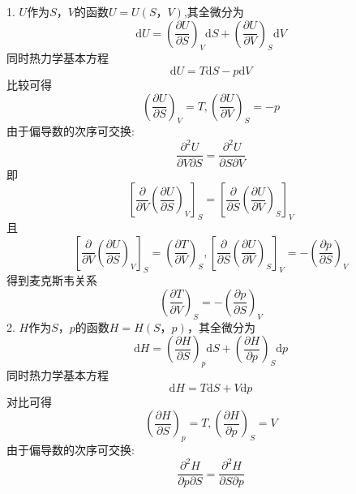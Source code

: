 1.
$U$作为$S$，$V$的函数$U=U(S，V)$,其全微分为
\begin{equation}
    \mathrm{d}U=\left( \frac{\partial U}{\partial S} \right) _V\mathrm{d}S+\left( \frac{\partial U}{\partial V} \right) _S\mathrm{d}V
\end{equation}
同时热力学基本方程
\begin{equation}
    \mathrm{d}U=T\mathrm{d}S-p\mathrm{d}V
\end{equation}
比较可得
\begin{equation}
    \left( \frac{\partial U}{\partial S} \right) _V=T,\left( \frac{\partial U}{\partial V} \right) _S=-p
\end{equation}
由于偏导数的次序可交换: 
\begin{equation}
    \frac{\partial ^2U}{\partial V\partial S}=\frac{\partial ^2U}{\partial S\partial V}
\end{equation}
即
\begin{equation}
    \left[ \frac{\partial}{\partial V}\left( \frac{\partial U}{\partial S} \right) _V \right] _S=\left[ \frac{\partial}{\partial S}\left( \frac{\partial U}{\partial V} \right) _S \right] _V
\end{equation}
且
\begin{equation}
    \left[ \frac{\partial}{\partial V}\left( \frac{\partial U}{\partial S} \right) _V \right] _S=\left( \frac{\partial T}{\partial V} \right) _S,\left[ \frac{\partial}{\partial S}\left( \frac{\partial U}{\partial V} \right) _S \right] _V=-\left( \frac{\partial p}{\partial S} \right) _V
\end{equation}
得到麦克斯韦关系
\begin{equation}
    \left( \frac{\partial T}{\partial V} \right) _S=-\left( \frac{\partial p}{\partial S} \right) _V
\end{equation}
2.
$H$作为$S$，$p$的函数$H=H(S，p)$，其全微分为
\begin{equation}
    \mathrm{d}H=\left( \frac{\partial H}{\partial S} \right) _{p}\mathrm{d}S+\left( \frac{\partial H}{\partial p} \right) _{S}\mathrm{d}p
\end{equation}
同时热力学基本方程
\begin{equation}
    \mathrm{d}H=T\mathrm{d}S+V\mathrm{d}p
\end{equation}
对比可得
\begin{equation}
    \left( \frac{\partial H}{\partial S} \right) _{p}=T,\left( \frac{\partial H}{\partial p} \right) _{S}=V
\end{equation}
由于偏导数的次序可交换: 
\begin{equation}
    \frac{\partial ^2H}{\partial p\partial S}=\frac{\partial ^2H}{\partial S\partial p}
\end{equation}
